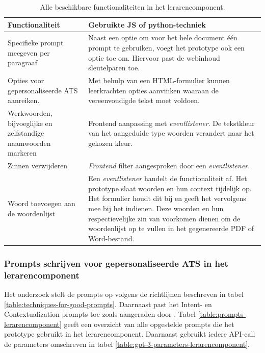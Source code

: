 \begin{center}
	\begin{table}[H]
		\begin{tabular}{ | m{7cm} | m{8cm} | } 
			\hline
			\textbf{Functionaliteit} & Gebruikte JS of python-techniek \\
			\hline
			Specifieke prompt meegeven per paragraaf & Naast een optie om voor het hele document één prompt te gebruiken, voegt het prototype ook een optie toe om. Hiervoor past de webinhoud sleutelparen toe. \\
			\hline
			Opties voor gepersonaliseerde ATS aanreiken. & Met behulp van een HTML-formulier kunnen leerkrachten opties aanvinken waaraan de vereenvoudigde tekst moet voldoen. \\
			\hline
			Werkwoorden, bijvoeglijke en zelfstandige naamwoorden markeren & Frontend aanpassing met \textit{eventlistener}. De tekstkleur van het aangeduide type woorden verandert naar het gekozen kleur. \\
			\hline
			Zinnen verwijderen & \textit{Frontend} filter aangesproken door een \textit{eventlistener}. \\
			\hline
			Woord toevoegen aan de woordenlijst & Een \textit{eventlistener} handelt de functionaliteit af. Het prototype slaat woorden en hun context tijdelijk op. Het formulier houdt dit bij en geeft het vervolgens mee bij het indienen. Deze woorden en hun respectievelijke zin van voorkomen dienen om de woordenlijst op te vullen in het gegenereerde PDF of Word-bestand. \\ 
			\hline 
		\end{tabular}
	\caption{Alle beschikbare functionaliteiten in het lerarencomponent.}
	\label{table:functionaliteiten-leerkrachten}
	\end{table}
\end{center}

\subsubsection{Prompts schrijven voor gepersonaliseerde ATS in het lerarencomponent}

Het onderzoek stelt de prompts op volgens de richtlijnen beschreven in tabel \ref{table:techniques-for-good-prompts}. Daarnaast past het Intent- en Contextualization prompts toe zoals aangeraden door \textcite{White2023}. Tabel \ref{table:prompts-lerarencomponent} geeft een overzicht van alle opgestelde prompts die het prototype gebruikt in het lerarencomponent. Daarnaast gebruikt iedere API-call de parameters omschreven in tabel \ref{table:gpt-3-parameters-lerarencomponent}.

